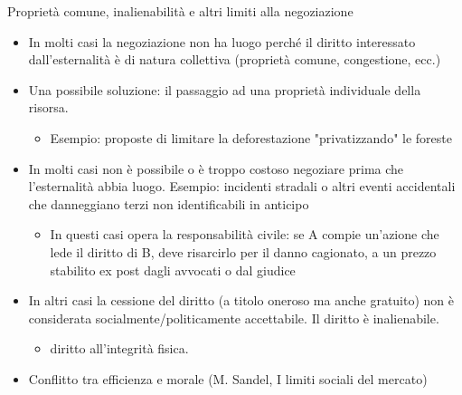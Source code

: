\documentclass[aspectratio=64,11pt]{beamer}
\begin{document}
\begin{frame}{Proprietà comune, inalienabilità e altri limiti alla negoziazione}
\begin{itemize}
\item In molti casi la negoziazione non ha luogo perché il diritto interessato
dall'esternalità è di natura collettiva (proprietà comune, congestione,
ecc.)
\item Una possibile soluzione: il passaggio ad una proprietà individuale della
risorsa.
\begin{itemize}
\item Esempio: proposte di limitare la deforestazione "privatizzando" le foreste
\end{itemize}
\item In molti casi non è possibile o è troppo costoso negoziare prima che
l'esternalità abbia luogo. Esempio: incidenti stradali o altri eventi
accidentali che danneggiano terzi non identificabili in anticipo
\begin{itemize}
\item In questi casi opera la responsabilità civile: se A compie un'azione che
lede il diritto di B, deve risarcirlo per il danno cagionato, a un prezzo
stabilito ex post dagli avvocati o dal giudice
\end{itemize}
\item In altri casi la cessione del diritto (a titolo oneroso ma anche gratuito)
non è considerata socialmente/politicamente accettabile. Il diritto è
inalienabile.
\begin{itemize}
\item diritto all'integrità fisica.
\end{itemize}
\item Conflitto tra efficienza e morale (M. Sandel, I limiti sociali del mercato)
\end{itemize}
\end{frame}
\end{document}
